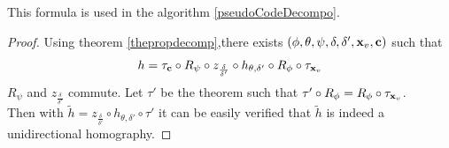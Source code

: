 		This formula is used in the algorithm \ref{pseudoCodeDecompo}.
		
		\begin{proof}
	 Using theorem \ref{thepropdecomp},there exists $(\phi,\theta,\psi,\delta,\delta',\mathbf{x}_v,\mathbf{c})$ such that 
	 \begin{equation*}
	 h = \tau_{\mathbf{c}} \circ R_{\psi} \circ z_{\frac{\delta}{\delta'}} \circ h_{\theta,\delta'} \circ R_{\phi} \circ \tau_{\mathbf{x}_v}
	 \end{equation*}
	 $R_\psi$ and $z_{\frac{\delta}{\delta'}}$ commute. Let $\tau'$ be the theorem such that $\tau' \circ R_\phi =  R_\phi \circ \tau_{\mathbf{x}_v}$.\\
	 Then with $\tilde{h} = z_{\frac{\delta}{\delta'}} \circ 
	 h_{\theta,\delta'} \circ \tau'$ it can be easily verified that $\tilde{h}$ is indeed a unidirectional homography.
	 \end{proof}
	\label{ref_schema_decomp_cool}
